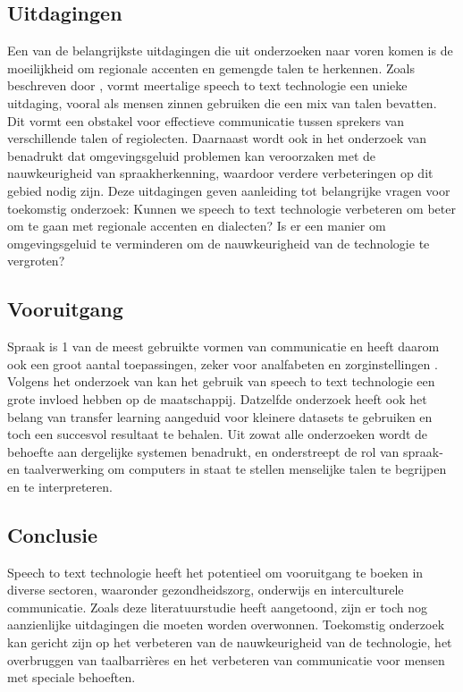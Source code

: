 \subsection{Uitdagingen}
Een van de belangrijkste uitdagingen die uit onderzoeken naar voren komen is de moeilijkheid om regionale accenten en gemengde talen te herkennen. 
Zoals beschreven door \autocite{Reddy2022}, vormt meertalige speech to text technologie een unieke uitdaging, vooral als mensen zinnen gebruiken die een mix van talen bevatten. 
Dit vormt een obstakel voor effectieve communicatie tussen sprekers van verschillende talen of regiolecten. Daarnaast wordt ook in het onderzoek van \autocite{ajami2016use} benadrukt dat omgevingsgeluid problemen kan veroorzaken met de nauwkeurigheid van spraakherkenning, waardoor verdere verbeteringen op dit gebied nodig zijn.
Deze uitdagingen geven aanleiding tot belangrijke vragen voor toekomstig onderzoek: Kunnen we speech to text technologie verbeteren om beter om te gaan met regionale accenten en dialecten? Is er een manier om omgevingsgeluid te verminderen om de nauwkeurigheid van de technologie te vergroten?


\subsection{Vooruitgang}
Spraak is 1 van de meest gebruikte vormen van communicatie en heeft daarom ook een groot aantal toepassingen, zeker voor analfabeten en zorginstellingen \autocite{Arun2021}. Volgens het onderzoek van \autocite{Roepke2019} kan het gebruik van speech to text technologie een grote invloed hebben op de maatschappij. Datzelfde onderzoek heeft ook het belang van transfer learning aangeduid voor kleinere datasets te gebruiken en toch een succesvol resultaat te behalen. Uit zowat alle onderzoeken wordt de behoefte aan dergelijke systemen benadrukt, en onderstreept de rol van spraak- en taalverwerking om computers in staat te stellen menselijke talen te begrijpen en te interpreteren.

\subsection{Conclusie}
Speech to text technologie heeft het potentieel om vooruitgang te boeken in diverse sectoren, waaronder gezondheidszorg, onderwijs en interculturele communicatie. Zoals deze literatuurstudie heeft aangetoond, zijn er toch nog aanzienlijke uitdagingen die moeten worden overwonnen. Toekomstig onderzoek kan gericht zijn op het verbeteren van de nauwkeurigheid van de technologie, het overbruggen van taalbarrières en het verbeteren van communicatie voor mensen met speciale behoeften.


